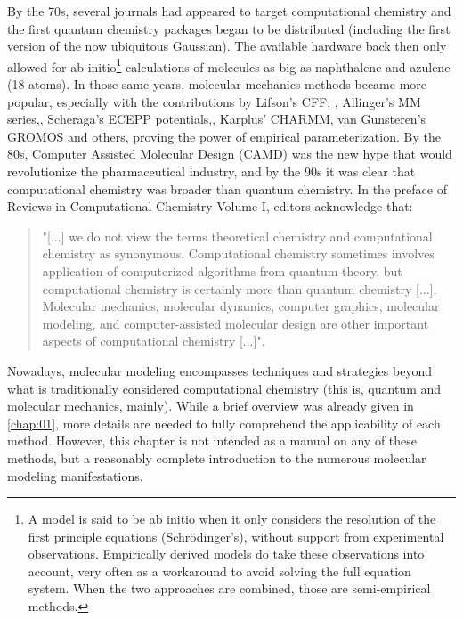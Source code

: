 By the 70s, several journals had appeared to target computational chemistry and the first quantum chemistry packages began to be distributed (including the first version of the now ubiquitous Gaussian\cite{gaussian}). The available hardware back then only allowed for ab initio\footnote{ A model is said to be ab initio when it only considers the resolution of the first principle equations (Schrödinger’s), without support from experimental observations. Empirically derived models do take these observations into account, very often as a workaround to avoid solving the full equation system. When the two approaches are combined, those are semi-empirical methods.  } calculations of molecules as big as naphthalene and azulene (18 atoms). In those same years, molecular mechanics methods became more popular, especially with the contributions by Lifson’s CFF, \cite{lifson1968consistent,hagler1974energy,niketic1977lecture}, Allinger’s MM series,\cite{allinger1973,allinger1977}, Scheraga’s ECEPP potentials,\cite{momany1975energy,nemethy1983energy}, Karplus’ CHARMM,\cite{brooks1983} van Gunsteren’s GROMOS\cite{van1987groningen} and others, proving the power of empirical parameterization. By the 80s, Computer Assisted Molecular Design (CAMD) was the new hype that would revolutionize the pharmaceutical industry,\cite{fortune1981} and by the 90s it was clear that computational chemistry was broader than quantum chemistry. In the preface of Reviews in Computational Chemistry Volume I,\cite{lipkovitz1990} editors acknowledge that:

\begin{quote}
	"[...] we do not view the terms theoretical chemistry and computational chemistry as synonymous. Computational chemistry sometimes involves application of computerized algorithms from quantum theory, but computational chemistry is certainly more than quantum chemistry [...]. Molecular mechanics, molecular dynamics, computer graphics, molecular modeling, and computer-assisted molecular design are other important aspects of computational chemistry [...]".
\end{quote}

Nowadays, molecular modeling encompasses techniques and strategies beyond what is traditionally considered computational chemistry (this is, quantum and molecular mechanics, mainly). While a brief overview was already given in \autoref{chap:01}, more details are needed to fully comprehend the applicability of each method. However, this chapter is not intended as a manual on any of these methods, but a reasonably complete introduction to the numerous molecular modeling manifestations.

